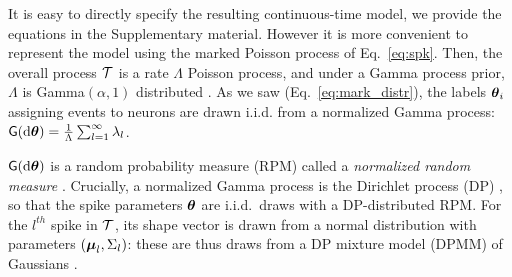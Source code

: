 % 
It is easy to directly specify the resulting continuous-time model, we provide the equations in the Supplementary material. 
However it is more convenient to represent the model using the marked Poisson process of Eq.~\eqref{eq:spk}. %
Then, the overall process $\mathcal{T}$ is a rate $\Lambda$ Poisson process,
and under a Gamma process prior, $\Lambda$ is Gamma$(\alpha,1)$ distributed %
\citep{Ferguson73}.
As we saw (Eq.~\eqref{eq:mark_distr}), the labels $\boldsymbol{\theta}_i$ assigning events to neurons are drawn i.i.d. from a normalized Gamma 
process: %
$ \mathsf{G}(\mathrm{d} \boldsymbol{\theta}) = \frac{1}{\Lambda} \sum_{l=1}^{\infty} \lambda_l$.

$\mathsf{G}(\mathrm{d} \boldsymbol{\theta})$ is a random probability measure (RPM) called a \emph{normalized random measure} \citep{JamesLP09}. Crucially, a 
normalized Gamma process is the Dirichlet process (DP) \citep{Ferguson73}, so that 
the spike parameters $\boldsymbol{\theta}$ are i.i.d.\ draws with a DP-distributed RPM.
For the $l^{th}$ spike in $\mathcal{T}$, its shape vector is drawn from a normal distribution
with parameters $(\boldsymbol{\mu}_{l}, \Sigma_{l})$: these are thus
draws from a DP mixture model (DPMM) of Gaussians \citep{Lo1984}.

